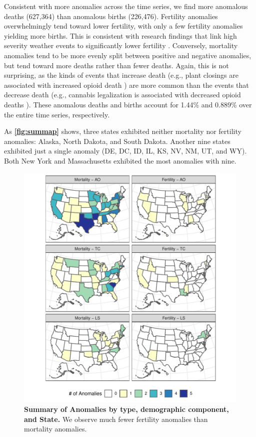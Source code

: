 \documentclass[12pt]{article}
\begin{document}
Consistent with more anomalies across the time series, we find more
anomalous deaths (627,364) than anomalous births (226,476). Fertility
anomalies overwhelmingly tend toward lower fertility, with only a few
fertility anomalies yielding more births. This is consistent with
research findings that link high severity weather events to
significantly lower fertility \citep{Evans2008Hurricanebirth}.
Conversely, mortality anomalies tend to be more evenly split between
positive and negative anomalies, but tend toward more deaths rather than
fewer deaths. Again, this is not surprising, as the kinds of events that
increase death (e.g., plant closings are associated with increased
opioid death \citep{Venkataramani2019}) are more common than the events
that decrease death (e.g., cannabis legalization is associated with
decreased opioid deaths \citep{Livingston2017Cannabis}). These anomalous
deaths and births account for 1.44\% and 0.889\% over the entire time
series, respectively.

As \textbf{\autoref{fig:summap}} shows, three states exhibited neither
mortality nor fertility anomalies: Alaska, North Dakota, and South
Dakota. Another nine states exhibited just a single anomaly (DE, DC, ID,
IL, KS, NV, NM, UT, and WY). Both New York and Massachusetts exhibited
the most anomalies with nine.

\begin{figure}
\centering
\includegraphics{manuscript_files/figure-latex/AnomalyMap-1.pdf}
\caption{\textbf{Summary of Anomalies by type, demographic component, and State.}
We observe much fewer fertility anomalies than mortality anomalies.
\label{fig:summap}}
\end{figure}
\end{document}
